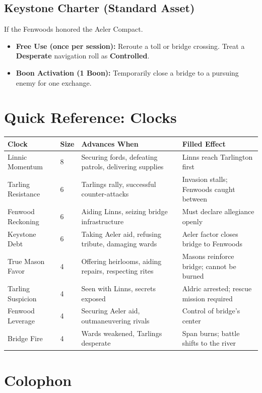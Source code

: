 \documentclass[11pt]{book}
\begin{document}
\section*{Keystone Charter (Standard Asset)}
If the Fenwoods honored the Aeler Compact.
\begin{itemize}
    \item \textbf{Free Use (once per session):} Reroute a toll or bridge crossing. Treat a \textbf{Desperate} navigation roll as \textbf{Controlled}.
    \item \textbf{Boon Activation (1 Boon):} Temporarily close a bridge to a pursuing enemy for one exchange.
\end{itemize}

\clearpage

\chapter*{Quick Reference: Clocks}

\begin{tabular}{|l|l|l|l|}
\hline
Clock & Size & Advances When & Filled Effect \\
\hline
Linnic Momentum & 8 & Securing fords, defeating patrols, delivering supplies & Linns reach Tarlington first \\
\hline
Tarling Resistance & 6 & Tarlings rally, successful counter-attacks & Invasion stalls; Fenwoods caught between \\
\hline
Fenwood Reckoning & 6 & Aiding Linns, seizing bridge infrastructure & Must declare allegiance openly \\
\hline
Keystone Debt & 6 & Taking Aeler aid, refusing tribute, damaging wards & Aeler factor closes bridge to Fenwoods \\
\hline
True Mason Favor & 4 & Offering heirlooms, aiding repairs, respecting rites & Masons reinforce bridge; cannot be burned \\
\hline
Tarling Suspicion & 4 & Seen with Linns, secrets exposed & Aldric arrested; rescue mission required \\
\hline
Fenwood Leverage & 4 & Securing Aeler aid, outmaneuvering rivals & Control of bridge's center \\
\hline
Bridge Fire & 4 & Wards weakened, Tarlings desperate & Span burns; battle shifts to the river \\
\hline
\end{tabular}

\clearpage
\chapter*{Colophon}
\end{document}
